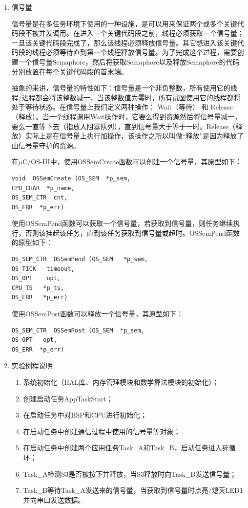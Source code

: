 ﻿\documentclass[UTF8,12pt]{article}
\begin{document}
\begin{enumerate}
  \item 信号量
  
  信号量是在多任务环境下使用的一种设施，是可以用来保证两个或多个关键代码段不被并发调用。在进入一个关键代码段之前，线程必须获取一个信号量；一旦该关键代码段完成了，那么该线程必须释放信号量。其它想进入该关键代码段的线程必须等待直到第一个线程释放信号量。为了完成这个过程，需要创建一个信号量Semaphore，然后将获取Semaphore以及释放Semaphore的代码分别放置在每个关键代码段的首末端。

  抽象的来讲，信号量的特性如下：信号量是一个非负整数，所有使用它的线程/进程都会将该整数减一，当该整数值为零时，所有试图使用它的线程都将处于等待状态。在信号量上我们定义两种操作： Wait（等待） 和 Release（释放）。当一个线程调用Wait操作时，它要么得到资源然后将信号量减一，要么一直等下去（指放入阻塞队列），直到信号量大于等于一时。Release（释放）实际上是在信号量上执行加操作，该操作之所以叫做“释放”是因为释放了由信号量守护的资源。

  在$\mu$C/OS-III中，使用OSSemCreate函数可以创建一个信号量，其原型如下：

  \begin{lstlisting}[frame=shadowbox]
void  OSSemCreate (OS_SEM  *p_sem, 
CPU_CHAR  *p_name,
OS_SEM_CTR  cnt,
OS_ERR  *p_err) 

  \end{lstlisting}
  使用OSSemPend函数可以获取一个信号量，若获取到信号量，则任务继续执行，否则该挂起该任务，直到该任务获取到信号量或超时。OSSemPend函数的原型如下：

  \begin{lstlisting}[frame=shadowbox]
OS_SEM_CTR  OSSemPend (OS_SEM   *p_sem,
OS_TICK   timeout,
OS_OPT    opt,
CPU_TS   *p_ts,
OS_ERR   *p_err)
  \end{lstlisting}
  使用OSSemPost函数可以释放一个信号量，其原型如下：

  \begin{lstlisting}[frame=shadowbox]
OS_SEM_CTR  OSSemPost (OS_SEM  *p_sem,
OS_OPT   opt,
OS_ERR  *p_err)

  \end{lstlisting}

  \item 实验例程说明
  \begin{enumerate}
    \item 系统初始化（HAL库、内存管理模块和数学算法模块的初始化）；
    \item 创建启动任务AppTaskStart；
    \item 在启动任务中对BSP和CPU进行初始化；
    \item 在启动任务中创建通信过程中使用的信号量等对象；
    \item 在启动任务中创建两个应用任务Task\_A和Task\_B，启动任务进入死循环；
    \item Task\_A检测S3是否被按下并释放，当S3释放时向Task\_B发送信号量；
    \item Task\_B等待Task\_A发送来的信号量，当获取到信号量时点亮/熄灭LED1并向串口发送数据。
  \end{enumerate}
\end{enumerate}
\end{document}

